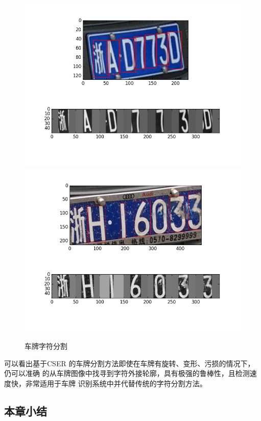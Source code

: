 \begin{figure}[th]
\centering
{}
{\includegraphics[width=1\linewidth]{./Figure/SegmentationDemo.png}}
{\includegraphics[width=1\linewidth]{./Figure/SegmentationDemo2.png}}
\caption{车牌字符分割}\label{Fig:SegmentationDemo}
\end{figure}

可以看出基于CSER 的车牌分割方法即使在车牌有旋转、变形、污损的情况下，仍可以准确
的从车牌图像中找寻到字符外接轮廓，具有极强的鲁棒性，且检测速度快，非常适用于车牌
识别系统中并代替传统的字符分割方法。

\subsection{本章小结}

